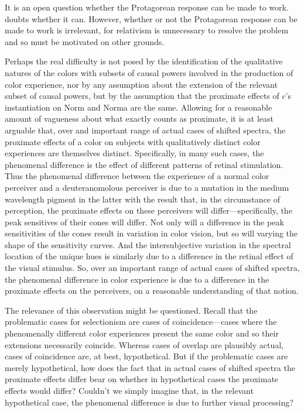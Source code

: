 \documentclass[12pt]{article}
\begin{document}
It is an open question whether the Protagorean response can be made to work. \citet{Shoemaker:wk} doubts whether it can. However, whether or not the Protagorean response can be made to work is irrelevant, for relativism is unnecessary to resolve the problem and so must be motivated on other grounds.

Perhaps the real difficulty is not posed by the identification of the qualitative natures of the colors with subsets of causal powers involved in the production of color experience, nor by any assumption about the extension of the relevant subset of causal powers, but by the assumption that the proximate effects of $c$'s instantiation on Norm and Norma are the same. Allowing for a reasonable amount of vagueness about what exactly counts as proximate, it is at least arguable that, over and important range of actual cases of shifted spectra, the proximate effects of a color on subjects with qualitatively distinct color experiences are themselves distinct. Specifically, in many such cases, the phenomenal difference is the effect of different patterns of retinal stimulation. Thus the phenomenal difference between the experience of a normal color perceiver and a deuteranomolous perceiver is due to a mutation in the medium wavelength pigment in the latter with the result that, in the circumstance of perception, the proximate effects on these perceivers will differ---specifically, the peak sensitives of their cones will differ. Not only will a difference in the peak sensitivities of the cones result in variation in color vision, but so will varying the shape of the sensitivity curves. And the intersubjective variation in the spectral location of the unique hues is similarly due to a difference in the retinal effect of the visual stimulus. So, over an important range of actual cases of shifted spectra, the phenomenal difference in color experience is due to a difference in the proximate effects on the perceivers, on a reasonable understanding of that notion.

The relevance of this observation might be questioned. Recall that the problematic cases for selectionism are cases of coincidence---cases where the phenomenally different color experiences present the same color and so their extensions necessarily coincide. Whereas cases of overlap are plausibly actual, cases of coincidence are, at best, hypothetical. But if the problematic cases are merely hypothetical, how does the fact that in actual cases of shifted spectra the proximate effects differ bear on whether in hypothetical cases the proximate effects would differ? Couldn't we simply imagine that, in the relevant hypothetical case, the phenomenal difference is due to further visual processing?
\end{document}

